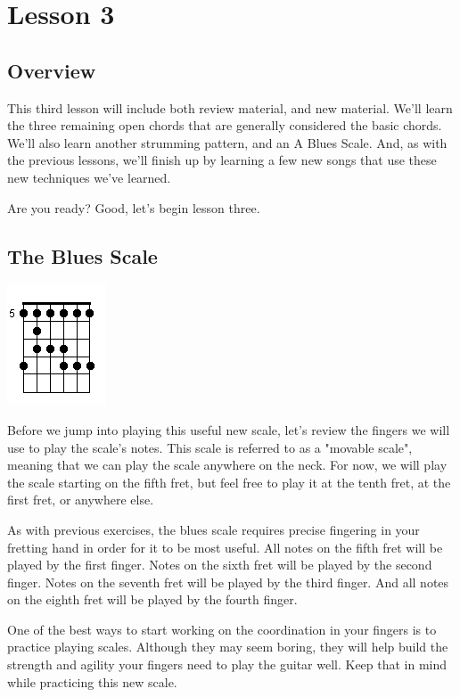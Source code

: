 \chapter{Lesson 3}
\section{Overview}
This third lesson will include both review material, and new material. We'll learn the three remaining open chords that are generally considered the basic chords. We'll also learn another strumming pattern, and an A Blues Scale. And, as with the previous lessons, we'll finish up by learning a few new songs that use these new techniques we've learned.

Are you ready? Good, let's begin lesson three.

\section{The Blues Scale}
\includegraphics{partthree/bluesscale.png}

Before we jump into playing this useful new scale, let's review the fingers we will use to play the scale's notes. This scale is referred to as a "movable scale", meaning that we can play the scale anywhere on the neck. For now, we will play the scale starting on the fifth fret, but feel free to play it at the tenth fret, at the first fret, or anywhere else.

As with previous exercises, the blues scale requires precise fingering in your fretting hand in order for it to be most useful. All notes on the fifth fret will be played by the first finger. Notes on the sixth fret will be played by the second finger. Notes on the seventh fret will be played by the third finger. And all notes on the eighth fret will be played by the fourth finger.

One of the best ways to start working on the coordination in your fingers is to practice playing scales. Although they may seem boring, they will help build the strength and agility your fingers need to play the guitar well. Keep that in mind while practicing this new scale.

